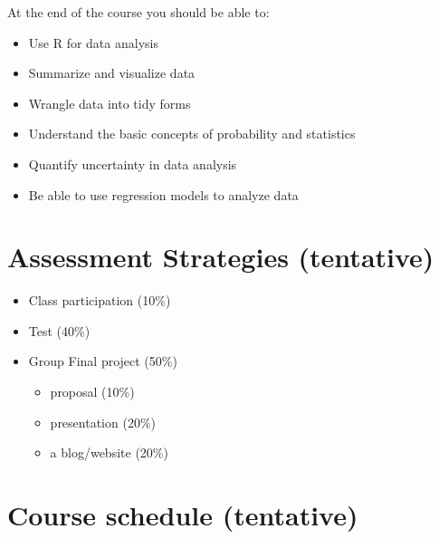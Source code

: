 \documentclass[
  letterpaper,
  DIV=11,
  numbers=noendperiod]{scrartcl}
\providecommand{\tightlist}{%
  \setlength{\itemsep}{0pt}\setlength{\parskip}{0pt}}
\begin{document}
At the end of the course you should be able to:

\begin{itemize}
\tightlist
\item
  Use R for data analysis
\item
  Summarize and visualize data
\item
  Wrangle data into tidy forms
\item
  Understand the basic concepts of probability and statistics
\item
  Quantify uncertainty in data analysis
\item
  Be able to use regression models to analyze data
\end{itemize}

\section{Assessment Strategies
(tentative)}\label{assessment-strategies-tentative}

\begin{itemize}
\tightlist
\item
  Class participation (10\%)
\item
  Test (40\%)
\item
  Group Final project (50\%)

  \begin{itemize}
  \tightlist
  \item
    proposal (10\%)
  \item
    presentation (20\%)
  \item
    a blog/website (20\%)
  \end{itemize}
\end{itemize}

\section{Course schedule (tentative)}\label{course-schedule-tentative}
\end{document}
